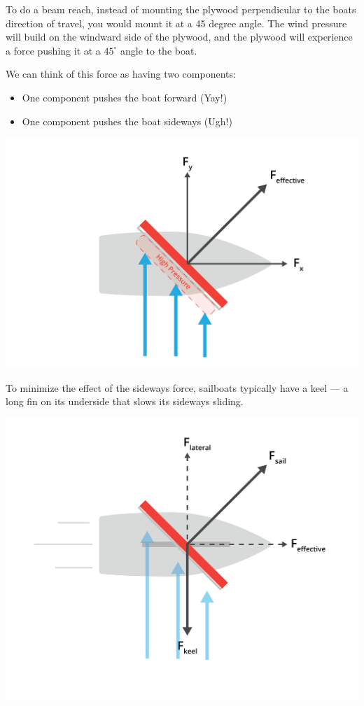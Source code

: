 To do a beam reach,  instead of mounting the plywood perpendicular to the boats direction of travel,  you would mount it at a 45 degree angle. The wind pressure will build on the windward
side of the plywood,  and the plywood will experience a force pushing it at a $45^\circ$ angle to the boat.

We can think of this force as having two components: 
\begin{itemize}
\item One component pushes the boat forward (Yay!)
\item One component pushes the boat sideways (Ugh!)
\end{itemize}
\begin{center}
    \includegraphics[width=.75\textwidth]{pressure.png}
    
\end{center}
To minimize the effect of the sideways force,  sailboats typically have  a keel --- a long fin on its underside that slows its sideways sliding.

\begin{center}
    \includegraphics[width=.75\textwidth]{pressure2.png}
    
\end{center}

